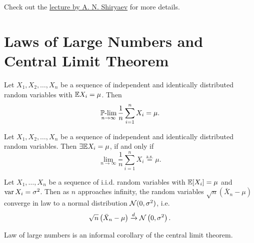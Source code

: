         Check out the \href{https://youtu.be/qKVoFqp1DzA}{lecture by A. N. Shiryaev} for more details.

    \section{Laws of Large Numbers and Central Limit Theorem}
        \begin{theorem}[Khinchin]
            Let $X_1, X_2, \dots, X_n$ be a sequence of independent and identically distributed random variables with $\mathbb{E} X_i = \mu$. Then
            \begin{equation}
                \operatorname*{\operatorname{\mathbb{P}-lim}}_{n \to \infty} \frac{1}{n} \sum_{i=1}^n X_i = \mu.
            \end{equation}
        \end{theorem}
        \begin{theorem}[Kolmogorov]
            Let $X_1, X_2, \dots, X_n$ be a sequence of independent and identically distributed random variables. Then $\exists \mathbb{E} X_i = \mu$, if and only if
            \begin{equation}
                \lim_{n \to \infty} \frac{1}{n} \sum_{i=1}^n X_i \overset{\text{a.s.}}{=} \mu.
            \end{equation}
        \end{theorem}

        \begin{theorem}
            Let $X_1, \dots, X_n$ be a sequence of i.i.d. random variables with $\mathbb{E}[X_i] = \mu$ and $\operatorname*{var} X_i = \sigma^2$. 
            Then as $n$ approaches infinity, the random variables $\sqrt{n}(\bar{X}_n - \mu)$ converge in law to a normal distribution ${\cal N}(0, \sigma^2)$, i.e.
            \begin{equation}
                \sqrt{n}\left(\bar{X}_n - \mu\right) \xrightarrow{d} {\cal N}\left(0,\sigma^2\right).
            \end{equation}
        \end{theorem}

        Law of large numbers is an informal corollary of the central limit theorem.



